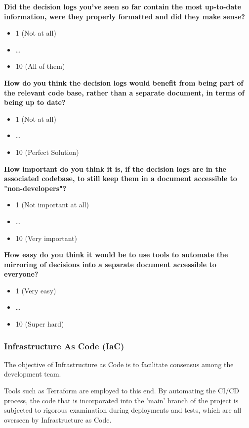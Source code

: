 \textbf{Did the decision logs you've seen so far contain the most up-to-date information, were they properly formatted and did they make sense?}
\begin{itemize}
    \item 1 (Not at all)
    \item \dots
    \item 10 (All of them)
\end{itemize}

\textbf{How do you think the decision logs would benefit from being part of the relevant code base, rather than a separate document, in terms of being up to date?}
\begin{itemize}
    \item 1 (Not at all)
    \item \dots
    \item 10 (Perfect Solution)
\end{itemize}

\textbf{How important do you think it is, if the decision logs are in the associated codebase, to still keep them in a document accessible to "non-developers"?}
\begin{itemize}
    \item 1 (Not important at all)
    \item \dots
    \item 10 (Very important)
\end{itemize}

\textbf{How easy do you think it would be to use tools to automate the mirroring of decisions into a separate document accessible to everyone?}
\begin{itemize}
    \item 1 (Very easy)
    \item \dots
    \item 10 (Super hard)
\end{itemize}

\subsubsection*{Infrastructure As Code (IaC)}

The objective of Infrastructure as Code is to facilitate consensus among the development team.

Tools such as Terraform are employed to this end. By automating the CI/CD process, the code that is incorporated into the 'main' branch of the project is subjected to rigorous examination during deployments and tests, which are all overseen by Infrastructure as Code.

